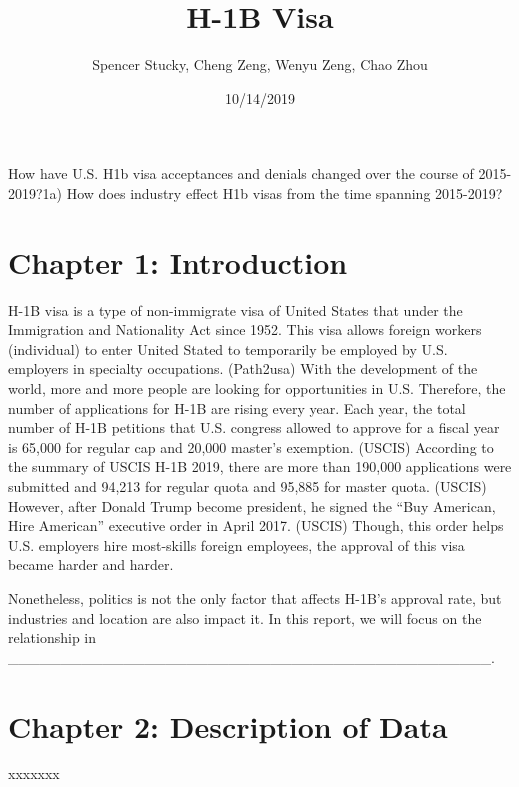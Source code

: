 \documentclass[]{article}
\title{H-1B Visa}
\author{Spencer Stucky, Cheng Zeng, Wenyu Zeng, Chao Zhou}
\date{10/14/2019}
\begin{document}
\maketitle

{
\setcounter{tocdepth}{4}
\tableofcontents
}
How have U.S. H1b visa acceptances and denials changed over the course
of 2015-2019?1a) How does industry effect H1b visas from the time
spanning 2015-2019?

\hypertarget{chapter-1-introduction}{%
\section{Chapter 1: Introduction}\label{chapter-1-introduction}}

H-1B visa is a type of non-immigrate visa of United States that under
the Immigration and Nationality Act since 1952. This visa allows foreign
workers (individual) to enter United Stated to temporarily be employed
by U.S. employers in specialty occupations. (Path2usa) With the
development of the world, more and more people are looking for
opportunities in U.S. Therefore, the number of applications for H-1B are
rising every year. Each year, the total number of H-1B petitions that
U.S. congress allowed to approve for a fiscal year is 65,000 for regular
cap and 20,000 master's exemption. (USCIS) According to the summary of
USCIS H-1B 2019, there are more than 190,000 applications were submitted
and 94,213 for regular quota and 95,885 for master quota. (USCIS)
However, after Donald Trump become president, he signed the ``Buy
American, Hire American'' executive order in April 2017. (USCIS) Though,
this order helps U.S. employers hire most-skills foreign employees, the
approval of this visa became harder and harder.

Nonetheless, politics is not the only factor that affects H-1B's
approval rate, but industries and location are also impact it. In this
report, we will focus on the relationship in
\_\_\_\_\_\_\_\_\_\_\_\_\_\_\_\_\_\_\_\_\_\_\_\_\_\_\_\_\_\_\_\_\_\_\_\_\_\_\_\_\_\_\_\_\_\_.

\hypertarget{chapter-2-description-of-data}{%
\section{Chapter 2: Description of
Data}\label{chapter-2-description-of-data}}

xxxxxxx
\end{document}

